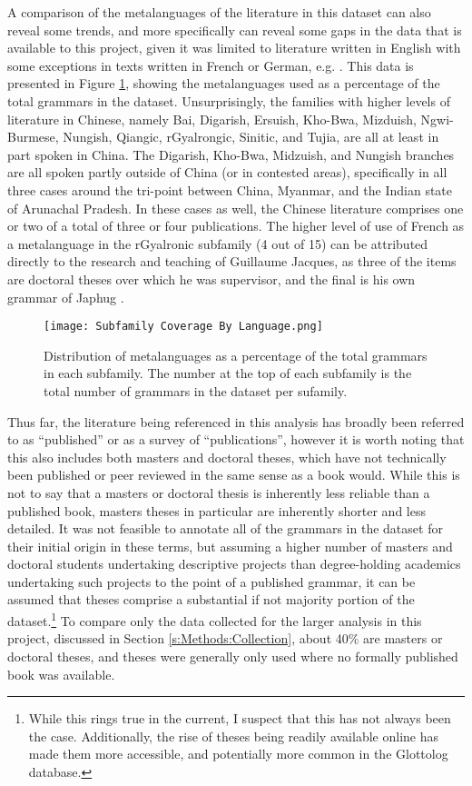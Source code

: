A comparison of the metalanguages of the literature in this dataset can also reveal some trends, and more specifically can reveal some gaps in the data that is available to this project, given it was limited to literature written in English with some exceptions in texts written in French or German, e.g. . This data is presented in Figure \ref{f:Description:SubfamilyCoverageByLanguage}, showing the metalanguages used as a percentage of the total grammars in the dataset. Unsurprisingly, the families with higher levels of literature in Chinese, namely Bai, Digarish, Ersuish, Kho-Bwa, Mizduish, Ngwi-Burmese, Nungish, Qiangic, rGyalrongic, Sinitic, and Tujia, are all at least in part spoken in China. The Digarish, Kho-Bwa, Midzuish, and Nungish branches are all spoken partly outside of China (or in contested areas), specifically in all three cases around the tri-point between China, Myanmar, and the Indian state of Arunachal Pradesh. In these cases as well, the Chinese literature comprises one or two of a total of three or four publications. The higher level of use of French as a metalanguage in the rGyalronic subfamily (4 out of 15) can be attributed directly to the research and teaching of Guillaume Jacques, as three of the items are doctoral theses over which he was supervisor, and the final is his own grammar of Japhug \cite{Jacques2021}.

\begin{figure}
        \centering
        \texttt{[image: Subfamily Coverage By Language.png]}
        \caption{Distribution of metalanguages as a percentage of the total grammars in each subfamily. The number at the top of each subfamily is the total number of grammars in the dataset per sufamily.}\label{f:Description:SubfamilyCoverageByLanguage}
\end{figure}

Thus far, the literature being referenced in this analysis has broadly been referred to as ``published'' or as a survey of ``publications'', however it is worth noting that this also includes both masters and doctoral theses, which have not technically been published or peer reviewed in the same sense as a book would. While this is not to say that a masters or doctoral thesis is inherently less reliable than a published book, masters theses in particular are inherently shorter and less detailed. It was not feasible to annotate all of the grammars in the dataset for their initial origin in these terms, but assuming a higher number of masters and doctoral students undertaking descriptive projects than degree-holding academics undertaking such projects to the point of a published grammar, it can be assumed that theses comprise a substantial if not majority portion of the dataset.\footnote{While this rings true in the current, I suspect that this has not always been the case. Additionally, the rise of theses being readily available online has made them more accessible, and potentially more common in the Glottolog database.} To compare only the data collected for the larger analysis in this project, discussed in Section \ref{s:Methods:Collection}, about 40\% are masters or doctoral theses, and theses were generally only used where no formally published book was available.

